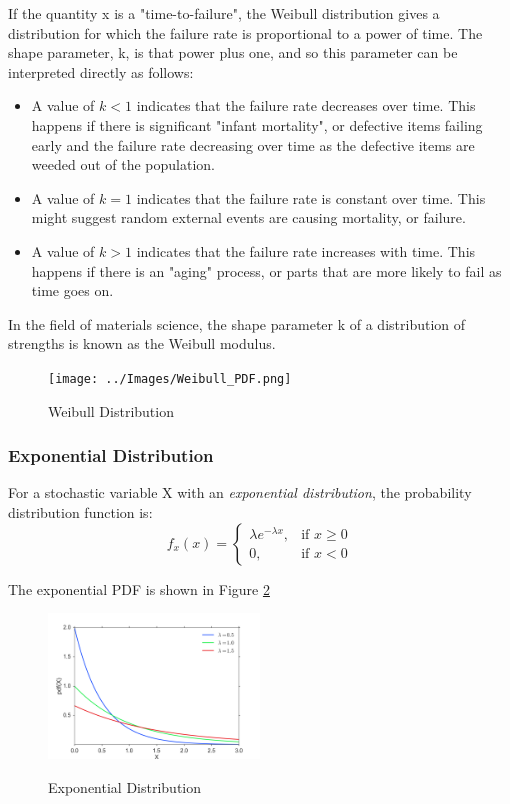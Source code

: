 If the quantity x is a "time-to-failure", the Weibull distribution gives a distribution for which the failure rate is proportional to a power of time. The shape parameter, k, is that power plus one, and so this parameter can be interpreted directly as follows:

\begin{itemize}
  \item  A value of $k < 1$ indicates that the failure rate decreases over time. This happens if there is significant "infant mortality", or defective items failing early and the failure rate decreasing over time as the defective items are weeded out of the population.

  \item  A value of $k = 1$ indicates that the failure rate is constant over time. This might suggest random external events are causing mortality, or failure.
  \item  A value of $k > 1$ indicates that the failure rate increases with time. This happens if there is an "aging" process, or parts that are more likely to fail as time goes on.
\end{itemize}

In the field of materials science, the shape parameter k of a distribution of strengths is known as the Weibull modulus.

\begin{figure}
  \centering
  \texttt{[image: ../Images/Weibull\_PDF.png]}\\
  \caption{Weibull Distribution}\label{fig:weibull}
\end{figure}


\subsubsection{Exponential Distribution}

For a stochastic variable X with an \emph{exponential distribution}, the probability distribution function is:
\begin{equation}\label{eq_exponential}
f_x (x) =
  \begin{cases}
\lambda e^{- \lambda x}, & \mbox{if } x \ge 0 \\
0, & \mbox{if } x < 0
\end{cases}
\end{equation}

The exponential PDF is shown in Figure \ref{fig:exponential}
\begin{figure}
  \centering
  \includegraphics[width=0.5\textwidth]{../Images/dist_exp.png}\\
  \caption{Exponential Distribution}\label{fig:exponential}
\end{figure}


